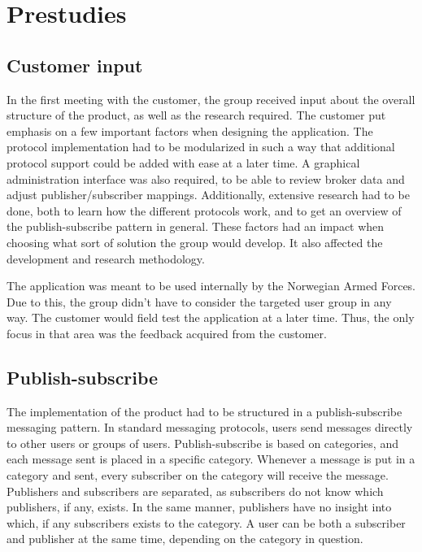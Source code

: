 
\chapter{Prestudies}
\label{ch:prestudies}

\section{Customer input}
\label{sec:prestudies-customer_input}

In the first meeting with the customer, the group received input about the overall structure of the product, as well as the research required. The customer put emphasis on a few important factors when designing the application. The protocol implementation had to be modularized in such a way that additional protocol support could be added with ease at a later time. A graphical administration interface was also required, to be able to review broker data and adjust publisher/subscriber mappings. Additionally, extensive research had to be done, both to learn how the different protocols work, and to get an overview of the publish-subscribe pattern in general. These factors had an impact when choosing what sort of solution the group would develop. It also affected the development and research methodology.

The application was meant to be used internally by the Norwegian Armed Forces. Due to this, the group didn't have to consider the targeted user group in any way. The customer would field test the application at a later time. Thus, the only focus in that area was the feedback acquired from the customer.

\section{Publish-subscribe}
\label{sec:prestudies-publish_subscribe}

The implementation of the product had to be structured in a publish-subscribe messaging pattern. In standard messaging protocols, users send messages directly to other users or groups of users. Publish-subscribe is based on categories, and each message sent is placed in a specific category. Whenever a message is put in a category and sent, every subscriber on the category will receive the message. Publishers and subscribers are separated, as subscribers do not know which publishers, if any, exists. In the same manner, publishers have no insight into which, if any subscribers exists to the category. A user can be both a subscriber and publisher at the same time, depending on the category in question.

